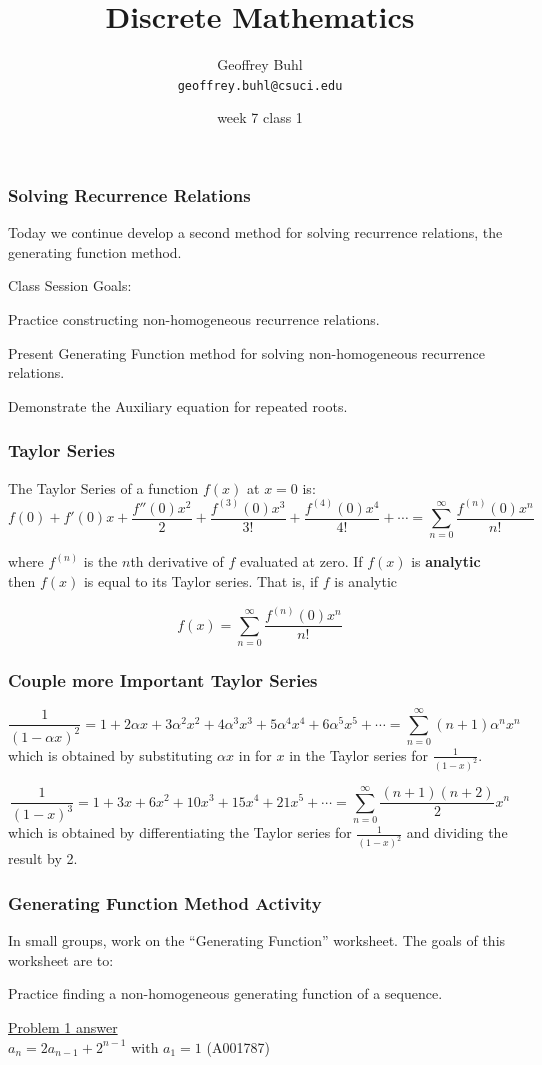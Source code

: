\documentclass{beamer}
\title{Discrete Mathematics}
\author[Geoffrey Buhl]{Geoffrey Buhl \\ \texttt{geoffrey.buhl@csuci.edu}}
\institute[CSUCI]{California State University Channel Islands}
\date{week 7 class 1}
\newenvironment{packed_enum}{
\begin{enumerate}
  \setlength{\itemsep}{1pt}
  \setlength{\parskip}{0pt}
  \setlength{\parsep}{0pt}
}{\end{enumerate}}
\begin{document}


\frame
{
  \frametitle{Solving Recurrence Relations}

Today we continue  develop a second method for solving recurrence relations, the generating function method.

\vfill
Class Session Goals:
\begin{packed_enum}
\item Practice constructing non-homogeneous recurrence relations.
\item Present Generating Function method for solving non-homogeneous recurrence relations.
\item Demonstrate the Auxiliary equation for repeated roots.
\end{packed_enum}
\vfill
}

\frame
{
  \frametitle{Taylor Series}

The Taylor Series of a function $f(x)$ at $x=0$ is:\\

$$f(0)+f'(0)x+\frac{f''(0)x^2}{2}+\frac{f^{(3)}(0)x^3}{3!}+\frac{f^{(4)}(0)x^4}{4!}+ \cdots=\sum^{\infty}_{n=0}\frac{f^{(n)}(0)x^n}{n!}$$

where $f^{(n)}$ is the $n$th derivative of $f$ evaluated at zero.  If $f(x)$ is {\bf analytic} then $f(x)$ is equal to its Taylor series. That is, if $f$ is analytic

$$f(x)=\sum^{\infty}_{n=0}\frac{f^{(n)}(0)x^n}{n!}$$
}

\frame
{
  \frametitle{Couple more Important Taylor Series}


$$\frac{1}{(1-\alpha x)^2}=1+2\alpha x+3\alpha^2x^2+4\alpha^3x^3+5\alpha^4x^4+6\alpha^5x^5+ \cdots=\sum_{n=0}^{\infty}(n+1)\alpha^nx^n$$
which is obtained by substituting $ \alpha x$ in for $x$ in the Taylor series for $\frac{1}{(1- x)^2}$.\vfill

$$\frac{1}{(1-x)^3}=1+3x+6x^2+10x^3+15x^4+21x^5+ \cdots=\sum_{n=0}^{\infty}\frac{(n+1)(n+2)}{2}x^n$$
which is obtained by differentiating the  Taylor series for $\frac{1}{(1-x)^2}$ and dividing the result by 2.

}

\frame
{
  \frametitle{Generating Function Method Activity}

In small groups, work on the ``Generating Function'' worksheet. The goals of this worksheet are to:
\vfill
\begin{packed_enum}
\item Practice finding a non-homogeneous generating function of a sequence.
\end{packed_enum}
\pause
\vfill
\underline{Problem 1 answer}\\$a_n=2a_{n-1}+2^{n-1}$ with $a_1=1$ (A001787)

}
\end{document}
